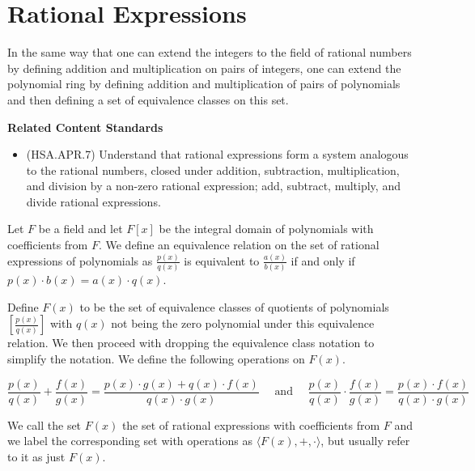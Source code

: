 \documentclass[
]{book}
\providecommand{\tightlist}{%
  \setlength{\itemsep}{0pt}\setlength{\parskip}{0pt}}
\newenvironment{standards}{}{}
\theoremstyle{definition}
\theoremstyle{definition}
\theoremstyle{definition}
\theoremstyle{definition}
\theoremstyle{remark}
\begin{document}
\hypertarget{rational-expressions}{%
\section{Rational Expressions}\label{rational-expressions}}

In the same way that one can extend the integers to the field of rational numbers by defining addition and multiplication on pairs of integers, one can extend the polynomial ring by defining addition and multiplication of pairs of polynomials and then defining a set of equivalence classes on this set.

\begin{standards}

\begin{center}
\textbf{Related Content Standards}

\end{center}

\begin{itemize}
\tightlist
\item
  (HSA.APR.7) Understand that rational expressions form a system analogous to the rational numbers, closed under addition, subtraction, multiplication, and division by a non-zero rational expression; add, subtract, multiply, and divide rational expressions.
\end{itemize}

\end{standards}

Let \(F\) be a field and let \(F[x]\) be the integral domain of polynomials with coefficients from \(F\). We define an equivalence relation on the set of rational expressions of polynomials as \(\frac{p(x)}{q(x)}\) is equivalent to \(\frac{a(x)}{b(x)}\) if and only if \(p(x) \cdot b(x)=a(x)\cdot q(x)\).

Define \(F(x)\) to be the set of equivalence classes of quotients of polynomials \(\left[\frac{p(x)}{q(x)}\right]\) with \(q(x)\) not being the zero polynomial under this equivalence relation. We then proceed with dropping the equivalence class notation to simplify the notation. We define the following operations on \(F(x)\).

\[\frac{p(x)}{q(x)} + \frac{f(x)}{g(x)} = \frac{p(x)\cdot g(x) + q(x) \cdot f(x)}{q(x)\cdot g(x)} \quad \mbox{ and } \quad \frac{p(x)}{q(x)} \cdot \frac{f(x)}{g(x)} = \frac{p(x) \cdot f(x)}{q(x)\cdot g(x)}\]

We call the set \(F(x)\) the set of rational expressions with coefficients from \(F\) and we label the corresponding set with operations as \(\langle F(x),+,\cdot\rangle\), but usually refer to it as just \(F(x)\).
\end{document}
